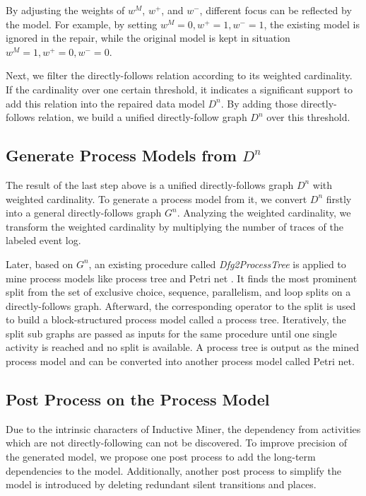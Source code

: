 By adjusting the weights of $w^{M}$, $w^{+}$, and $w^{-}$, different focus can be reflected by the model. For example, by setting $w^{M}=0, w^{+}=1, w^{-}=1$, the existing model is ignored in the repair, while  the original model is kept in situation $w^{M}=1, w^{+}=0, w^{-}=0$.

Next, we filter the directly-follows relation according to its weighted cardinality. If the cardinality over one certain threshold, it indicates a significant support to add this relation into the repaired data model $D^n$. By adding those directly-follows relation, we build a unified directly-follow graph $D^n$ over this threshold. 
\subsection{Generate Process Models from $D^n$}
The result of the last step above is a unified directly-follows graph $D^n$ with weighted cardinality. To generate a process model from it, we convert $D^n$ firstly into a general directly-follows graph $G^n$. Analyzing the weighted cardinality, we transform the weighted cardinality by multiplying the number of traces of the labeled event log.

Later, based on $G^n$, an existing procedure called \emph{Dfg2ProcessTree} is applied to mine process models like process tree and Petri net \cite{leemans2013discovering}. It finds the most prominent split from the set of exclusive choice, sequence, parallelism, and loop splits on  a directly-follows graph.  Afterward, the corresponding operator to the split is used to build a block-structured process model called a process tree. Iteratively, the split sub graphs are passed as inputs for the same procedure until one single activity is reached and no split is available. A process tree is output as the mined process model and can be converted into another process model called Petri net.
\subsection{Post Process on the Process Model}
Due to the intrinsic characters of Inductive Miner, the dependency from activities which are not directly-following can not be discovered. To improve precision of the generated model, we propose one post process to add the long-term dependencies to the model. Additionally, another post process to simplify the model is introduced by deleting redundant silent transitions and places.
